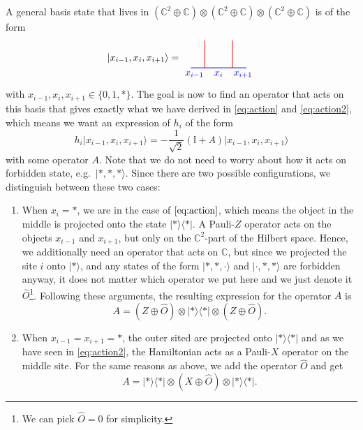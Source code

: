 A general basis state that lives in $(\mathbb{C}^2\oplus \mathbb{C})\otimes(\mathbb{C}^2\oplus \mathbb{C})\otimes(\mathbb{C}^2\oplus \mathbb{C})$ is of the form
	\begin{equation}
		\lvert x_{i-1}, x_i, x_{i+1}\rangle=\begin{tikzpicture}[scale=1,baseline=(current bounding box.center)]
		\draw [blue, line width=0.25mm] (-0.5,0) to node[below, near start] {$x_{i-1}$} (0,0);
		\draw [blue, line width=0.25mm] (0,0) to node[below] {$x_i$} (1,0);
		\draw [blue, line width=0.25mm] (1,0) to node[below, near end] {$x_{i+1}$} (1.5,0);
		\draw [red, line width=0.25mm] (0,0) -- (0,1);
		\draw [red, line width=0.25mm] (1,0) -- (1,1);
		\end{tikzpicture}
	\end{equation}
with $x_{i-1}, x_i, x_{i+1}\in\{0,1,*\}$. The goal is now to find an operator that acts on this basis that gives exactly what we have derived in \eqref{eq:action} and \eqref{eq:action2}, which means we want an expression of $h_i$ of the form
	\begin{equation}
		h_i\lvert x_{i-1},x_i,x_{i+1}\rangle=-\frac{1}{\sqrt{2}}\left(\mathbb{I}+A\right)\lvert x_{i-1},x_i,x_{i+1}\rangle
	\end{equation}
with some operator $A$. Note that we do not need to worry about how it acts on forbidden state, e.g.\ $\lvert *,*,*\rangle$. Since there are two possible configurations, we distinguish between these two cases:
	\begin{enumerate}
		\item When $x_i=*$, we are in the case of $\eqref{eq:action}$, which means the object in the middle is projected onto the state $\lvert*\rangle\langle*\rvert$. A Pauli-$Z$ operator acts on the objects $x_{i-1}$ and $x_{i+1}$, but only on the $\mathbb{C}^2$-part of the Hilbert space. Hence, we additionally need an operator that acts on $\mathbb{C}$, but since we projected the site $i$ onto $\lvert *\rangle$, and any states of the form $\lvert *,*,\cdot\rangle$ and $\lvert \cdot,*,*\rangle$ are forbidden anyway, it does not matter which operator we put here and we just denote it $\hat{O}$\footnote{We can pick $\hat{O}=0$ for simplicity.}. Following these arguments, the resulting expression for the operator $A$ is
			\begin{equation}
				A=(Z\oplus\hat{O})\otimes\lvert*\rangle\langle*\rvert\otimes(Z\oplus\hat{O}).
			\end{equation}
		\item When $x_{i-1}=x_{i+1}=*$, the outer sited are projected onto $\lvert*\rangle\langle*\rvert$ and as we have seen in \eqref{eq:action2}, the Hamiltonian acts as a Pauli-$X$ operator on the middle site. For the same reasons as above, we add the operator $\hat{O}$ and get
			\begin{equation}
				A=\lvert*\rangle\langle*\rvert\otimes(X\oplus\hat{O})\otimes\lvert*\rangle\langle*\rvert.
			\end{equation}
	\end{enumerate}

